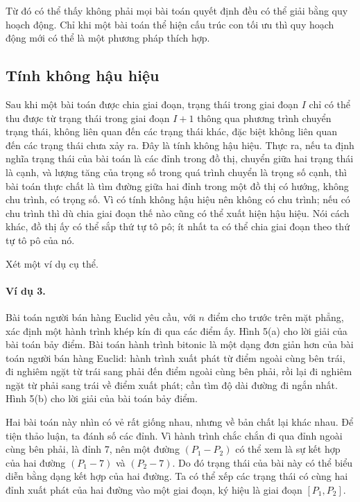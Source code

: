 \documentclass[11pt]{article}
\begin{document}
Từ đó có thể thấy không phải mọi bài toán quyết định đều có thể giải bằng quy
hoạch động. Chỉ khi một bài toán thể hiện cấu trúc con tối ưu thì quy hoạch
động mới có thể là một phương pháp thích hợp.

\subsection{Tính không hậu hiệu}

Sau khi một bài toán được chia giai đoạn, trạng thái trong giai đoạn \(I\) chỉ
có thể thu được từ trạng thái trong giai đoạn \(I+1\) thông qua phương trình
chuyển trạng thái, không liên quan đến các trạng thái khác, đặc biệt không
liên quan đến các trạng thái chưa xảy ra. Đây là tính không hậu hiệu. Thực ra,
nếu ta định nghĩa trạng thái của bài toán là các đỉnh trong đồ thị, chuyển
giữa hai trạng thái là cạnh, và lượng tăng của trọng số trong quá trình
chuyển là trọng số cạnh, thì bài toán thực chất là tìm đường giữa hai đỉnh
trong một đồ thị có hướng, không chu trình, có trọng số. Vì có tính không hậu
hiệu nên không có chu trình; nếu có chu trình thì dù chia giai đoạn thế nào
cũng có thể xuất hiện hậu hiệu. Nói cách khác, đồ thị ấy có thể sắp thứ tự tô
pô; ít nhất ta có thể chia giai đoạn theo thứ tự tô pô của nó.

Xét một ví dụ cụ thể.

\paragraph{Ví dụ 3.}
Bài toán người bán hàng Euclid yêu cầu, với \(n\) điểm cho trước trên mặt
phẳng, xác định một hành trình khép kín đi qua các điểm ấy. Hình 5(a) cho lời
giải của bài toán bảy điểm. Bài toán hành trình bitonic là một dạng đơn giản
hơn của bài toán người bán hàng Euclid: hành trình xuất phát từ điểm ngoài
cùng bên trái, đi nghiêm ngặt từ trái sang phải đến điểm ngoài cùng bên phải,
rồi lại đi nghiêm ngặt từ phải sang trái về điểm xuất phát; cần tìm độ dài
đường đi ngắn nhất. Hình 5(b) cho lời giải của bài toán bảy điểm.

Hai bài toán này nhìn có vẻ rất giống nhau, nhưng về bản chất lại khác nhau.
Để tiện thảo luận, ta đánh số các đỉnh. Vì hành trình chắc chắn đi qua đỉnh
ngoài cùng bên phải, là đỉnh 7, nên một đường \((P_1-P_2)\) có thể xem là sự
kết hợp của hai đường \((P_1-7)\) và \((P_2-7)\). Do đó trạng thái của bài
này có thể biểu diễn bằng dạng kết hợp của hai đường. Ta có thể xếp các trạng
thái có cùng hai đỉnh xuất phát của hai đường vào một giai đoạn, ký hiệu là
giai đoạn \([P_1,P_2]\).
\end{document}
